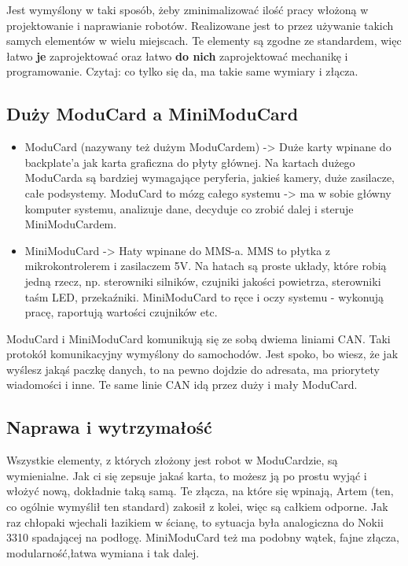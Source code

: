 \documentclass[b5paper, 10pt, twoside]{book}
\begin{document}
Jest wymyślony w taki sposób, żeby zminimalizować ilość pracy włożoną w projektowanie i naprawianie robotów. Realizowane jest to przez używanie takich samych elementów w wielu miejscach. Te elementy są zgodne ze standardem, więc łatwo \textbf{je} zaprojektować oraz łatwo \textbf{do nich} zaprojektować mechanikę i programowanie. Czytaj: co tylko się da, ma takie same wymiary i złącza.

\subsection{Duży ModuCard a MiniModuCard}
\begin{itemize}
  \item ModuCard (nazywany też dużym ModuCardem) -> Duże karty wpinane do backplate'a jak karta graficzna do płyty głównej. Na kartach dużego ModuCarda są bardziej wymagające peryferia, jakieś kamery, duże zasilacze, całe podsystemy. ModuCard to mózg całego systemu -> ma w sobie główny komputer systemu, analizuje dane, decyduje co zrobić dalej i steruje MiniModuCardem.
  \item MiniModuCard -> Haty wpinane do MMS-a. MMS to płytka z mikrokontrolerem i zasilaczem 5V. Na hatach są proste układy, które robią jedną rzecz, np. sterowniki silników, czujniki jakości powietrza, sterowniki taśm LED, przekaźniki. MiniModuCard to ręce i oczy systemu - wykonują pracę, raportują wartości czujników etc.
\end{itemize}



ModuCard i MiniModuCard komunikują się ze sobą dwiema liniami CAN. Taki protokół komunikacyjny wymyślony do samochodów. Jest spoko, bo wiesz, że jak wyślesz jakąś paczkę danych, to na pewno dojdzie do adresata, ma priorytety wiadomości i inne. Te same linie CAN idą przez duży i mały ModuCard.

\subsection{Naprawa i wytrzymałość}

Wszystkie elementy, z których złożony jest robot w ModuCardzie, są wymienialne. Jak ci się zepsuje jakaś karta, to możesz ją po prostu wyjąć i włożyć nową, dokładnie taką samą. Te złącza, na które się wpinają, Artem (ten, co ogólnie wymyślił ten standard) zakosił z kolei, więc są całkiem odporne. Jak raz chłopaki
wjechali łazikiem w ścianę, to sytuacja była analogiczna do Nokii 3310 spadającej na podłogę. MiniModuCard też ma podobny wątek, fajne złącza, modularność,łatwa wymiana i tak dalej.
\end{document}
